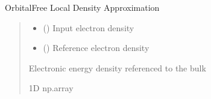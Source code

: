 \documentclass[letterpaper,10pt,english]{sphinxmanual}
\begin{document}
\begin{fulllineitems}
\label{\detokenize{fcdft.jellium:fcdft.jellium.jellium.gamma}}
\pysigstartsignatures
\pysiglinewithargsret
{}
{\sphinxparamcomma {}}
{}
\pysigstopsignatures
\sphinxAtStartPar
Orbital\sphinxhyphen{}Free Local Density Approximation
\begin{quote}\begin{description}
\begin{itemize}
\item {} 
\sphinxAtStartPar
{} () \textendash{} Input electron density

\item {} 
\sphinxAtStartPar
{} () \textendash{} Reference electron density

\end{itemize}

\sphinxAtStartPar
Electronic energy density referenced to the bulk

\sphinxAtStartPar
1D np.array

\end{description}\end{quote}

\end{fulllineitems}

\end{document}
